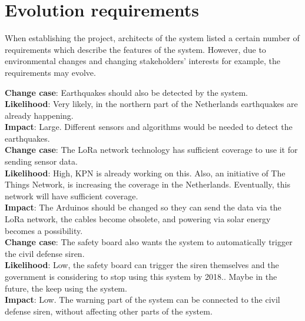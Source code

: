 \section{Evolution requirements}


When establishing the project, architects of the system listed a certain number of requirements which describe the features of the system. However, due to environmental changes and changing stakeholders' interests for example, the requirements may evolve.


	
\textbf{Change case}: Earthquakes should also be detected by the system. \\
\textbf{Likelihood}: Very likely, in the northern part of the Netherlands earthquakes are already happening. \\ 
\textbf{Impact}:  Large. Different sensors and algorithms would be needed to detect the earthquakes. \\


\textbf{Change case}: The LoRa network technology has sufficient coverage to use it for sending sensor data. \\
\textbf{Likelihood}: High, KPN is already working on this. Also, an initiative of The Things Network, is increasing the coverage in the Netherlands. Eventually, this network will have sufficient coverage. \\
\textbf{Impact}: The Arduinos should be changed so they can send the data via the LoRa network, the cables become obsolete, and powering via solar energy becomes a possibility. \\


\textbf{Change case}: The safety board also wants the system to automatically trigger the civil defense siren. \\
\textbf{Likelihood}: Low, the safety board can trigger the siren themselves and the government is considering to stop using this system by 2018.\cite{luchtalarm}. Maybe in the future, the keep using the system. \\
\textbf{Impact}: Low. The warning part of the system can be connected to the civil defense siren, without affecting other parts of the system.



